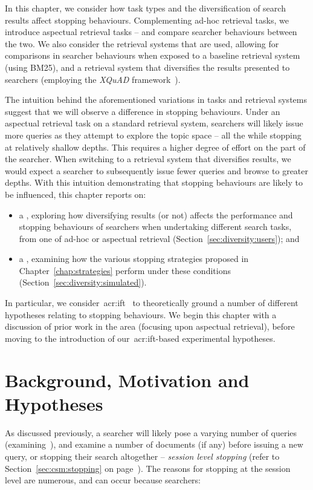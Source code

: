 In this chapter, we consider how task types and the diversification of search results affect stopping behaviours. Complementing ad-hoc retrieval tasks, we introduce aspectual retrieval tasks -- and compare searcher behaviours between the two. We also consider the retrieval systems that are used, allowing for comparisons in searcher behaviours when exposed to a baseline retrieval system (using BM25), and a retrieval system that diversifies the results presented to searchers (employing the \emph{XQuAD} framework~\citep{santos2010query_reformulations_diversification}).

The intuition behind the aforementioned variations in tasks and retrieval systems suggest that we will observe a difference in stopping behaviours. Under an aspectual retrieval task on a standard retrieval system, searchers will likely issue more queries as they attempt to explore the topic space -- all the while stopping at relatively shallow depths. This requires a higher degree of effort on the part of the searcher. When switching to a retrieval system that diversifies results, we would expect a searcher to subsequently issue fewer queries and browse to greater depths. With this intuition demonstrating that stopping behaviours are likely to be influenced, this chapter reports on:

\begin{itemize}
    \item{a , exploring how diversifying results (or not) affects the performance and stopping behaviours of searchers when undertaking different search tasks, from one of ad-hoc or aspectual retrieval (Section~\ref{sec:diversity:users}); and}
    \item{a , examining how the various stopping strategies proposed in Chapter~\ref{chap:strategies} perform under these conditions (Section~\ref{sec:diversity:simulated}).}
\end{itemize}

In particular, we consider~\gls{acr:ift}~\citep{pirolli1999ift} to theoretically ground a number of different hypotheses relating to stopping behaviours. We begin this chapter with a discussion of prior work in the area (focusing upon aspectual retrieval), before moving to the introduction of our~\gls{acr:ift}-based experimental hypotheses.

\section{Background, Motivation and Hypotheses}\label{sec:diversity:background}
As discussed previously, a searcher will likely pose a varying number of queries (examining~), and examine a number of documents (if any) before issuing a new query, or stopping their search altogether -- \emph{session level stopping} (refer to Section~\ref{sec:csm:stopping} on page~\pageref{sec:csm:stopping}). The reasons for stopping at the session level are numerous, and can occur because searchers:

